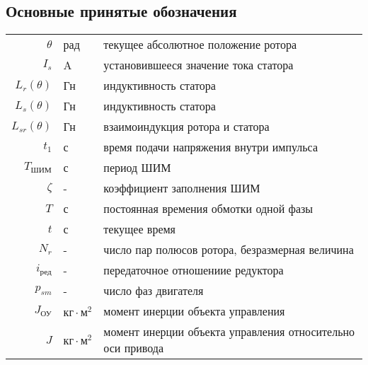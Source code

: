 \newpage
\subsection{ Основные принятые обозначения }

\begin{table}[ht!]
    \begin{tabular}{rll}
    $\theta$            & рад & текущее абсолютное положение ротора \\

    $I_{s}$             & A & установившееся значение тока статора \\

    $L_{r}(\theta)$     & Гн & индуктивность статора \\
    
    $L_{s}(\theta)$     & Гн & индуктивность статора \\
    
    $L_{sr}(\theta)$    & Гн & взаимоиндукция ротора и статора \\
    
    $t_{1}$             & с & время подачи напряжения внутри импульса \\
    
    $T_\text{ШИМ}$      & с & период ШИМ \\
    
    $\zeta$             & - & коэффициент заполнения ШИМ \\
    
    $T$                 & с & постоянная времения обмотки одной фазы \\
    
    $t$                 & с & текущее время \\
    
    $N_{r}$             & - & число пар полюсов ротора, безразмерная величина \\
    
    $i_\text{ред}$      & - & передаточное отношениие редуктора \\
    
    $p_{sm}$            & - & число фаз двигателя \\
    
    $J_{\text{ОУ}}$     & $\text{кг} \cdot \text{м}^{2}$ & момент инерции объекта управления \\
    
    $J$                 & $\text{кг} \cdot \text{м}^{2}$ & момент инерции объекта управления относительно оси привода \\
    

\end{tabular}
\end{table}

